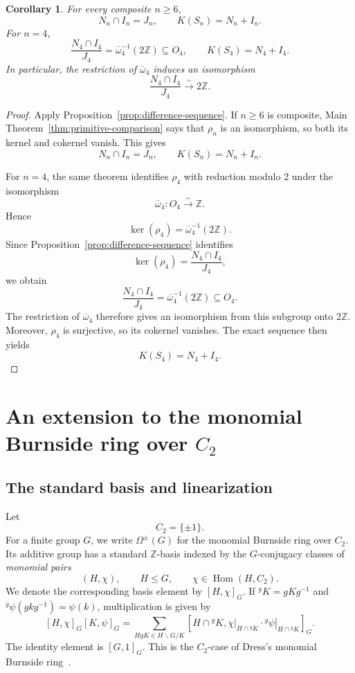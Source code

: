 \documentclass[a4paper,11pt]{article}
\numberwithin{equation}{section}
\newtheorem{corollary}[theorem]{Corollary}
\newcommand{\Z}{\mathbb{Z}}
\newcommand{\Hom}{\operatorname{Hom}}
\begin{document}
\begin{corollary}\label{cor:lattice-equalities}
For every composite $n\ge6$,
\[
  N_n\cap I_n=J_n,
  \qquad
  K(S_n)=N_n+I_n.
\]
For $n=4$,
\[
  \frac{N_4\cap I_4}{J_4}
  =\overline\omega_4^{-1}(2\Z)
  \subseteq O_4,
  \qquad
  K(S_4)=N_4+I_4.
\]
In particular, the restriction of $\overline\omega_4$ induces an
isomorphism
\[
  \frac{N_4\cap I_4}{J_4}
  \xrightarrow{\sim}
  2\Z.
\]
\end{corollary}

\begin{proof}
Apply Proposition~\ref{prop:difference-sequence}. If $n\ge6$ is composite,
Main Theorem~\ref{thm:primitive-comparison} says that $\rho_n$ is an
isomorphism, so both its kernel and cokernel vanish. This gives
\[
  N_n\cap I_n=J_n,
  \qquad
  K(S_n)=N_n+I_n.
\]

For $n=4$, the same theorem identifies $\rho_4$ with reduction modulo $2$
under the isomorphism
\[
  \overline\omega_4:O_4\xrightarrow{\sim}\Z.
\]
Hence
\[
  \ker(\rho_4)
  =\overline\omega_4^{-1}(2\Z).
\]
Since Proposition~\ref{prop:difference-sequence} identifies
\[
  \ker(\rho_4)
  =\frac{N_4\cap I_4}{J_4},
\]
we obtain
\[
  \frac{N_4\cap I_4}{J_4}
  =\overline\omega_4^{-1}(2\Z)
  \subseteq O_4.
\]
The restriction of $\overline\omega_4$ therefore gives an isomorphism from
this subgroup onto $2\Z$. Moreover, $\rho_4$ is surjective, so its cokernel
vanishes. The exact sequence then yields
\[
  K(S_4)=N_4+I_4.
\]
\end{proof}


\section{An extension to the monomial Burnside ring over \texorpdfstring{$C_2$}{C2}}
\label{sec:monomial}

\subsection{The standard basis and linearization}

Let
\[
  C_2=\{\pm1\}.
\]
For a finite group $G$, we write $\Omega^{\pm}(G)$ for the monomial Burnside
ring over $C_2$. Its additive group has a standard $\Z$-basis indexed by the
$G$-conjugacy classes of \emph{monomial pairs}
\[
  (H,\chi),
  \qquad
  H\le G,
  \qquad
  \chi\in\Hom(H,C_2).
\]
We denote the corresponding basis element by $[H,\chi]_G$. If
${}^gK=gKg^{-1}$ and ${}^g\psi(gkg^{-1})=\psi(k)$, multiplication is given by
\[
  [H,\chi]_G[K,\psi]_G
  =
  \sum_{HgK\in H\backslash G/K}
  \left[
    H\cap{}^gK,
    \left.\chi\right|_{H\cap{}^gK}
    \cdot
    \left.{}^g\psi\right|_{H\cap{}^gK}
  \right]_G.
\]
The identity element is $[G,1]_G$. This is the $C_2$-case of Dress's
monomial Burnside ring~\cite{DressMonomial}.
\end{document}
